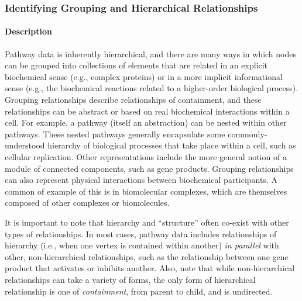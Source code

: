 \documentclass[twocolumn]{bmcart}%
\begin{document}
\subsubsection*{Identifying Grouping and Hierarchical Relationships}

\paragraph*{Description}

Pathway data is inherently hierarchical, and there are many ways in which nodes can be grouped into collections of elements that are related in an explicit biochemical sense (e.g., complex proteins) or in a more implicit informational sense (e.g., the biochemical reactions related to a higher-order biological process).
Grouping relationships describe relationships of containment, and these relationships can be abstract or based on real biochemical interactions within a cell.
For example, a pathway (itself an abstraction) can be nested within other pathways.
These nested pathways generally encapsulate some commonly-understood hierarchy of biological processes that take place within a cell, such as cellular replication.
Other representations include the more general notion of a module of connected components, such as gene products.
Grouping relationships can also represent physical interactions between biochemical participants.
A common of example of this is in biomolecular complexes, which are themselves composed of other complexes or biomolecules.

It is important to note that hierarchy and ``structure'' often co-exist with other types of relationships.
In most cases, pathway data includes relationships of hierarchy (i.e., when one vertex is contained within another) \textit{in parallel} with other, non-hierarchical relationships, such as the relationship between one gene product that activates or inhibits another.
Also, note that while non-hierarchical relationships can take a variety of forms, the only form of hierarchical relationship is one of \textit{containment}, from parent to child, and is undirected.
\end{document}
